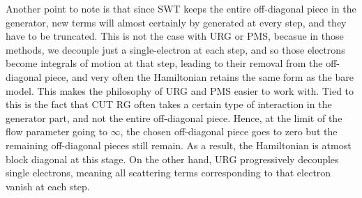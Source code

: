 Another point to note is that since SWT keeps the entire off-diagonal piece in the generator, new terms will almost certainly by generated at every step, and they have to be truncated. This is not the case with URG or PMS, becasue in those methods, we decouple just a single-electron at each step, and so those electrons become integrals of motion at that step, leading to their removal from the off-diagonal piece, and very often the Hamiltonian retains the same form as the bare model. This makes the philosophy of URG and PMS easier to work with. Tied to this is the fact that CUT RG often takes a certain type of interaction in the generator part, and not the entire off-diagonal piece. Hence, at the limit of the flow parameter going to \(\infty\), the chosen off-diagonal piece goes to zero but the remaining off-diagonal pieces still remain. As a result, the Hamiltonian is atmost block diagonal at this stage. On the other hand, URG progressively decouples single electrons, meaning all scattering terms corresponding to that electron vanish at each step. 

